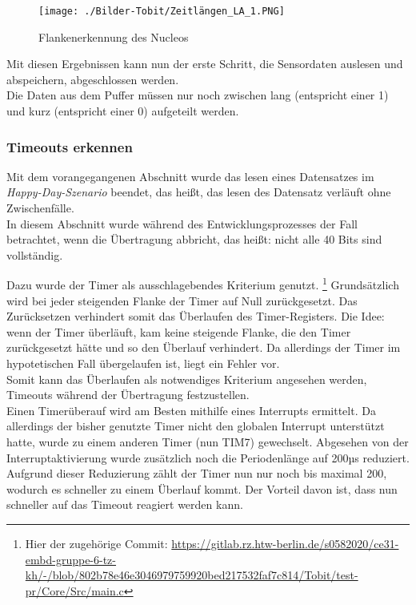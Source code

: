 \documentclass[11pt,a4paper,titlepage]{article}
\begin{document}
\begin{figure}[H]
    \centering
    \texttt{[image: ./Bilder-Tobit/Zeitlängen\_LA\_1.PNG]}
    \caption{Flankenerkennung des Nucleos}
    \label{fig:Flanken}
\end{figure}

Mit diesen Ergebnissen kann nun der erste Schritt, die Sensordaten auslesen und abspeichern, abgeschlossen werden.\\
Die Daten aus dem Puffer müssen nur noch zwischen lang (entspricht einer 1) und kurz (entspricht einer 0) aufgeteilt werden.\\

\subsubsection{Timeouts erkennen}
\label{sec:Timeouts_erkennen}
Mit dem vorangegangenen Abschnitt wurde das lesen eines Datensatzes im \textit{Happy-Day-Szenario} beendet,
das heißt, das lesen des Datensatz verläuft ohne Zwischenfälle.\\
In diesem Abschnitt wurde während des Entwicklungsprozesses der Fall betrachtet, wenn die Übertragung abbricht,
das heißt: nicht alle 40 Bits sind vollständig.

Dazu wurde der Timer als ausschlagebendes Kriterium genutzt.
\footnote{Hier der zugehörige Commit: \url{https://gitlab.rz.htw-berlin.de/s0582020/ce31-embd-gruppe-6-tz-kh/-/blob/802b78e46e3046979759920bed217532faf7c814/Tobit/test-pr/Core/Src/main.c}}
Grundsätzlich wird bei jeder steigenden Flanke der Timer auf Null zurückgesetzt.
Das Zurücksetzen verhindert somit das Überlaufen des Timer-Registers.
Die Idee: wenn der Timer überläuft, kam keine steigende Flanke, die den Timer zurückgesetzt hätte und so den Überlauf verhindert.
Da allerdings der Timer im hypotetischen Fall übergelaufen ist, liegt ein Fehler vor.\\

Somit kann das Überlaufen als notwendiges Kriterium angesehen werden, Timeouts während der Übertragung festzustellen.\\

Einen Timerüberauf wird am Besten mithilfe eines Interrupts ermittelt.
Da allerdings der bisher genutzte Timer nicht den globalen Interrupt unterstützt hatte,
wurde zu einem anderen Timer (nun TIM7) gewechselt.
Abgesehen von der Interruptaktivierung wurde zusätzlich noch die Periodenlänge auf 200µs reduziert.
Aufgrund dieser Reduzierung zählt der Timer nun nur noch bis maximal 200, wodurch es schneller zu einem Überlauf kommt.
Der Vorteil davon ist, dass nun schneller auf das Timeout reagiert werden kann.
\end{document}
